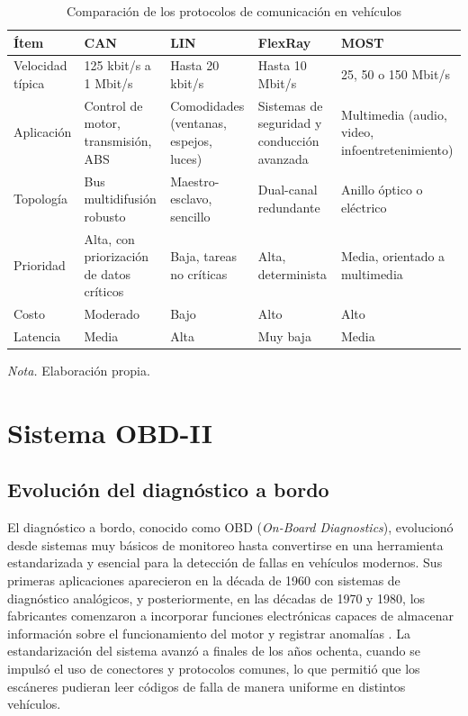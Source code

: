 \begin{table}[htbp]
	\centering
	\captionsetup{labelformat=simple, labelsep=newline, textfont=it, labelfont=bf}
	\caption{Comparación de los protocolos de comunicación en vehículos}
	\label{table:caract}
	\vspace{0.3cm}
	
	\begin{tabularx}{\linewidth}{p{2.4cm} X X X X}
		\toprule 
		\rowcolor[rgb]{0.851, 0.851, 0.851}
		\textbf{Ítem} & \textbf{CAN} & \textbf{LIN} & \textbf{FlexRay} & \textbf{MOST} \\
		\midrule 
		Velocidad típica & 125 kbit/s a 1 Mbit/s & Hasta 20 kbit/s & Hasta 10 Mbit/s & 25, 50 o 150 Mbit/s \\
		Aplicación & Control de motor, transmisión, ABS & Comodidades (ventanas, espejos, luces) & Sistemas de seguridad y conducción avanzada & Multimedia (audio, video, infoentretenimiento) \\
		Topología & Bus multidifusión robusto & Maestro-esclavo, sencillo & Dual-canal redundante & Anillo óptico o eléctrico \\
		Prioridad & Alta, con priorización de datos críticos & Baja, tareas no críticas & Alta, determinista & Media, orientado a multimedia \\
		Costo & Moderado & Bajo & Alto & Alto \\
		Latencia & Media & Alta & Muy baja & Media \\
		\bottomrule 
	\end{tabularx}
	\vspace{0.2cm}
	
	\begin{flushleft}
		\footnotesize \textit{Nota.} Elaboración propia.
	\end{flushleft}
\end{table}


\section{Sistema OBD-II}
\subsection{Evolución del diagnóstico a bordo}

El diagnóstico a bordo, conocido como OBD (\textit{On-Board Diagnostics}), evolucionó desde sistemas muy básicos de monitoreo hasta convertirse en una herramienta estandarizada y esencial para la detección de fallas en vehículos modernos. Sus primeras aplicaciones aparecieron en la década de 1960 con sistemas de diagnóstico analógicos, y posteriormente, en las décadas de 1970 y 1980, los fabricantes comenzaron a incorporar funciones electrónicas capaces de almacenar información sobre el funcionamiento del motor y registrar anomalías \citep{Geotab_OBDII}. La estandarización del sistema avanzó a finales de los años ochenta, cuando se impulsó el uso de conectores y protocolos comunes, lo que permitió que los escáneres pudieran leer códigos de falla de manera uniforme en distintos vehículos. 

